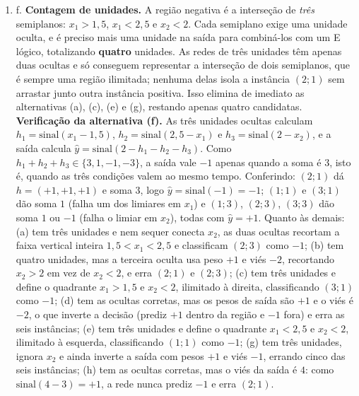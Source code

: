 \documentclass{dlproblemset}
\begin{document}
\begin{enumerate}[1)]
    \item f. \textbf{Contagem de unidades.} A região negativa é a interseção de \emph{três} semiplanos: $x_1 > 1{,}5$, $x_1 < 2{,}5$ e $x_2 < 2$. Cada semiplano exige uma unidade oculta, e é preciso mais uma unidade na saída para combiná-los com um E lógico, totalizando \textbf{quatro} unidades. As redes de três unidades têm apenas duas ocultas e só conseguem representar a interseção de dois semiplanos, que é sempre uma região ilimitada; nenhuma delas isola a instância $(2;1)$ sem arrastar junto outra instância positiva. Isso elimina de imediato as alternativas (a), (c), (e) e (g), restando apenas quatro candidatas. \textbf{Verificação da alternativa (f).} As três unidades ocultas calculam $h_1 = \mathrm{sinal}(x_1 - 1{,}5)$, $h_2 = \mathrm{sinal}(2{,}5 - x_1)$ e $h_3 = \mathrm{sinal}(2 - x_2)$, e a saída calcula $\hat{y} = \mathrm{sinal}(2 - h_1 - h_2 - h_3)$. Como $h_1 + h_2 + h_3 \in \{3, 1, -1, -3\}$, a saída vale $-1$ apenas quando a soma é $3$, isto é, quando as três condições valem ao mesmo tempo. Conferindo: $(2;1)$ dá $h = (+1, +1, +1)$ e soma $3$, logo $\hat{y} = \mathrm{sinal}(-1) = -1$; $(1;1)$ e $(3;1)$ dão soma $1$ (falha um dos limiares em $x_1$) e $(1;3)$, $(2;3)$, $(3;3)$ dão soma $1$ ou $-1$ (falha o limiar em $x_2$), todas com $\hat{y} = +1$. Quanto às demais: (a) tem três unidades e nem sequer conecta $x_2$, as duas ocultas recortam a faixa vertical inteira $1{,}5 < x_1 < 2{,}5$ e classificam $(2;3)$ como $-1$; (b) tem quatro unidades, mas a terceira oculta usa peso $+1$ e viés $-2$, recortando $x_2 > 2$ em vez de $x_2 < 2$, e erra $(2;1)$ e $(2;3)$; (c) tem três unidades e define o quadrante $x_1 > 1{,}5$ e $x_2 < 2$, ilimitado à direita, classificando $(3;1)$ como $-1$; (d) tem as ocultas corretas, mas os pesos de saída são $+1$ e o viés é $-2$, o que inverte a decisão (prediz $+1$ dentro da região e $-1$ fora) e erra as seis instâncias; (e) tem três unidades e define o quadrante $x_1 < 2{,}5$ e $x_2 < 2$, ilimitado à esquerda, classificando $(1;1)$ como $-1$; (g) tem três unidades, ignora $x_2$ e ainda inverte a saída com pesos $+1$ e viés $-1$, errando cinco das seis instâncias; (h) tem as ocultas corretas, mas o viés da saída é $4$: como $\mathrm{sinal}(4 - 3) = +1$, a rede nunca prediz $-1$ e erra $(2;1)$.


\end{enumerate}
\end{document}
